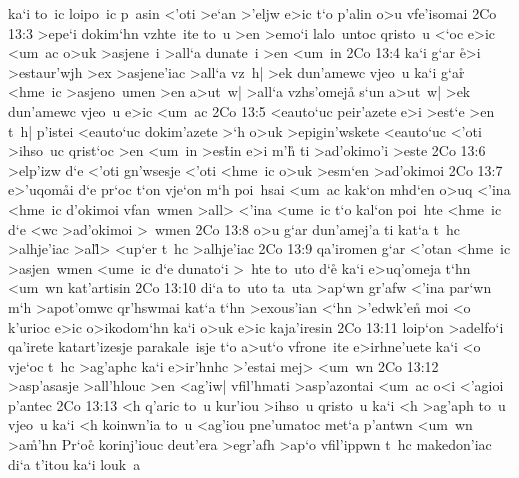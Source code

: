 ka`i
to~ic
loipo~ic
p~asin
<'oti
>e`an
>'eljw
e>ic
t`o
p'alin
o>u
vfe'isomai\bibvsend
\vs 2Co 13:3
>epe`i
dokim`hn
vzhte~ite
to~u
>en
>emo`i
lalo~untoc
qristo~u
<`oc
e>ic
<um~ac
o>uk
>asjene~i
>all`a
dunate~i
>en
<um~in\bibvsend
\vs 2Co 13:4
ka`i
g`ar
\r{e}>i
>estaur'wjh
>ex
>asjene'iac
>all`a
vz~h|
>ek
dun'amewc
vjeo~u
ka`i
g`a\r{r}
<hme~ic
>asjeno~umen
>en
a>ut~w|
>all`a
vzhs'omej\r{a}
s`un
a>ut~w|
>ek
dun'amewc
vjeo~u
e>ic
<um~ac\bibvsend
\vs 2Co 13:5
<eauto`uc
peir'azete
e>i
>est`e
>en
t~h|
p'istei
<eauto`uc
dokim'azete
>`h
o>uk
>epigin'wskete
<eauto`uc
<'oti
>ihso~uc
qrist`oc
>en
<um~in
>es\r{t}in
e>i
m'h\r{}
ti
>ad'okimo'i
>este\bibvsend
\vs 2Co 13:6
>elp'izw
d`e
<'oti
gn'wsesje
<'oti
<hme~ic
o>uk
>esm`en
>ad'okimoi\bibvsend
\vs 2Co 13:7
e>'uqom\r{a}i
d`e
pr`oc
t`on
vje`on
m`h
poi~hsai
<um~ac
kak`on
mhd`en
o>uq
<'ina
<hme~ic
d'okimoi
vfan~wmen
>all>
<'ina
<ume~ic
t`o
kal`on
poi~hte
<hme~ic
d`e
<wc
>ad'okimoi
>~wmen\bibvsend
\vs 2Co 13:8
o>u
g`ar
dun'amej'a
ti
kat`a
t~hc
>alhje'iac
>al\r{l}>
<up`er
t~hc
>alhje'iac\bibvsend
\vs 2Co 13:9
qa'iromen
g`ar
<'otan
<hme~ic
>asjen~wmen
<ume~ic
d`e
dunato`i
>~hte
to~uto
d`e\r{}
ka`i
e>uq'omeja
t`hn
<um~wn
kat'artisin\bibvsend
\vs 2Co 13:10
di`a
to~uto
ta~uta
>ap`wn
gr'afw
<'ina
par`wn
m`h
>apot'omwc
qr'hswmai
kat`a
t`hn
>exous'ian
<`hn
>'edwk'en\r{}
moi
<o
k'urioc
e>ic
o>ikodom`hn
ka`i
o>uk
e>ic
kaja'iresin\bibvsend
\vs 2Co 13:11
loip`on
>adelfo`i
qa'irete
katart'izesje
parakale~isje
t`o
a>ut`o
vfrone~ite
e>irhne'uete
ka`i
<o
vje`oc
t~hc
>ag'aphc
ka`i
e>ir'hnhc
>'estai
mej>
<um~wn\bibvsend
\vs 2Co 13:12
>asp'asasje
>all'hlouc
>en
<ag'iw|
vfil'hmati
>asp'azontai
<um~ac
o<i
<'agioi
p'antec\bibvsend
\vs 2Co 13:13
<h
q'aric
to~u
kur'iou
>ihso~u
qristo~u
ka`i
<h
>ag'aph
to~u
vjeo~u
ka`i
<h
koinwn'ia
to~u
<ag'iou
pne'umatoc
met`a
p'antwn
<um~wn
>a\r{m}'hn\bibvsend
{}
Pr`oc\r{}
korinj'iouc
deut'era
>egr'afh
>ap`o
vfil'ippwn
t~hc
makedon'iac
di`a
t'itou
ka`i
louk~a\bibvsend
